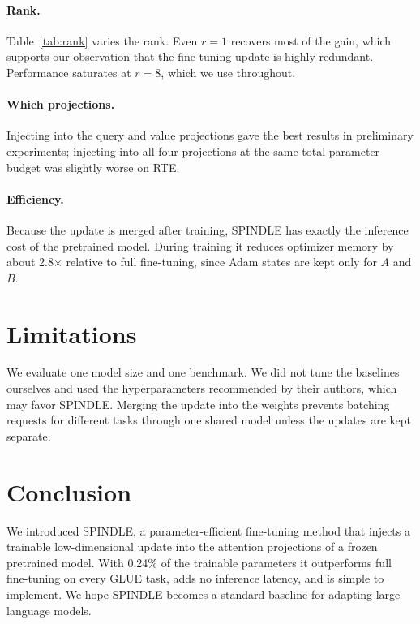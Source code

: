\documentclass[10pt]{article}
\begin{document}
\paragraph{Rank.} Table~\ref{tab:rank} varies the rank. Even $r = 1$ recovers most of the gain, which supports our observation that the fine-tuning update is highly redundant. Performance saturates at $r = 8$, which we use throughout.

\paragraph{Which projections.} Injecting into the query and value projections gave the best results in preliminary experiments; injecting into all four projections at the same total parameter budget was slightly worse on RTE.

\paragraph{Efficiency.} Because the update is merged after training, SPINDLE has exactly the inference cost of the pretrained model. During training it reduces optimizer memory by about 2.8$\times$ relative to full fine-tuning, since Adam states are kept only for $A$ and $B$.

\section{Limitations}
We evaluate one model size and one benchmark. We did not tune the baselines ourselves and used the hyperparameters recommended by their authors, which may favor SPINDLE. Merging the update into the weights prevents batching requests for different tasks through one shared model unless the updates are kept separate.

\section{Conclusion}
We introduced SPINDLE, a parameter-efficient fine-tuning method that injects a trainable low-dimensional update into the attention projections of a frozen pretrained model. With 0.24\% of the trainable parameters it outperforms full fine-tuning on every GLUE task, adds no inference latency, and is simple to implement. We hope SPINDLE becomes a standard baseline for adapting large language models.
\end{document}
